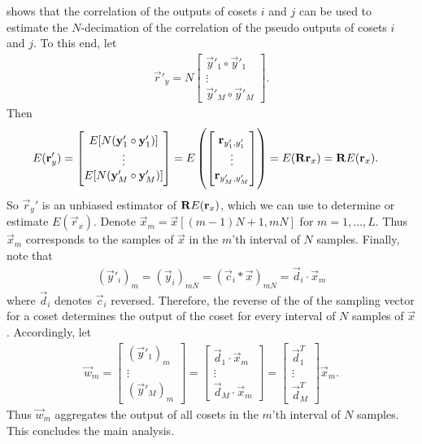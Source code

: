 \documentclass[a4paper, openany, oneside]{memoir}
\begin{document}
 shows that the correlation of the outputs of cosets $i$ and $j$ can be used to estimate the $N$-decimation of the correlation of the pseudo outputs of cosets $i$ and $j$. To this end, let
\begin{align*}
    \vec{r}'_y = N \begin{bmatrix}
        \vec{y}'_1 \circ \vec{y}'_1 \\
        \vdots \\
        \vec{y}'_M \circ \vec{y}'_M
    \end{bmatrix}.
\end{align*}
Then
\begin{align*}
    E(\boldsymbol{\mathbf{r}}'_y) &= \begin{bmatrix}
        E[N(\boldsymbol{\mathbf{y}}'_1 \circ \boldsymbol{\mathbf{y}}'_1)] \\
        \vdots \\
        E[N(\boldsymbol{\mathbf{y}}'_M \circ \boldsymbol{\mathbf{y}}'_M)]
    \end{bmatrix}
    = E\left(\begin{bmatrix}
        \boldsymbol{\mathbf{r}}_{y'_1,y'_1} \\
        \vdots \\
        \boldsymbol{\mathbf{r}}_{y'_M,y'_M} \\
    \end{bmatrix}\right) = E(\boldsymbol{\mathbf{R}} \boldsymbol{\mathbf{r}}_x) = \boldsymbol{\mathbf{R}} E(\boldsymbol{\mathbf{r}}_x).
\end{align*}
So $\vec{r}_y'$ is an unbiased estimator of $\boldsymbol{\mathbf{R}} E(\boldsymbol{\mathbf{r}}_x)$, which we can use to determine or estimate $E(\vec{r}_x)$. Denote $\vec{x}_m = \vec{x}[(m-1)N+1,mN]$ for $m = 1,\ldots,L$. Thus $\vec{x}_m$ corresponds to the samples of $\vec{x}$ in the $m$'th interval of $N$ samples. Finally, note that
\begin{align*}
    (\vec{y}'_i)_m = (\vec{y}_i)_{mN} = (\vec{c}_i \ast \vec{x})_{mN} = \vec{d}_i \cdot \vec{x}_m
\end{align*}
where $\vec{d}_i$ denotes $\vec{c}_i$ reversed. Therefore, the reverse of the of the sampling vector for a coset determines the output of the coset for every interval of $N$ samples of $\vec{x}$. Accordingly, let
\begin{align*}
    \vec{w}_m = \begin{bmatrix}
        (\vec{y}'_1)_m \\
        \vdots \\
        (\vec{y}'_M)_m
    \end{bmatrix} = \begin{bmatrix}
        \vec{d}_1 \cdot \vec{x}_m \\
        \vdots \\
        \vec{d}_M \cdot \vec{x}_m
    \end{bmatrix} = \begin{bmatrix}
        \vec{d}_1^T\\
        \vdots \\
        \vec{d}_M^T
    \end{bmatrix} \vec{x}_m.
\end{align*}
Thus $\vec{w}_m$ aggregates the output of all cosets in the $m$'th interval of $N$ samples. This concludes the main analysis.
\end{document}
